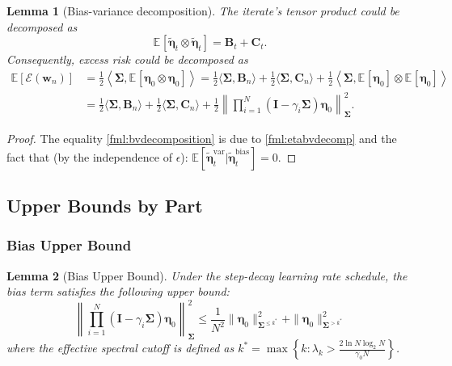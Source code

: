 \documentclass{article}
\theoremstyle{definition}
\theoremstyle{definition}
\theoremstyle{plain}
\theoremstyle{plain}
\theoremstyle{plain}
\newtheorem{lemma}{Lemma}
\theoremstyle{plain}
\theoremstyle{plain}
\newcommand{\bs}[1]{\boldsymbol{\mathbf{#1}}}
\newcommand{\Ex}{\mathbb{E}}
\newcommand{\Sig}{\mathbf{\Sigma}}
\newcommand{\w}{\mathbf{w}}
\newcommand{\id}{\mathbf{I}}
\newcommand{\bias}{\mathrm{bias}}
\newcommand{\var}{\mathrm{var}}
\newcommand{\ex}[2][]{\mathbb{E}_{#1}\left[ #2 \right]}
\newcommand{\nm}[2][]{\left\| #2 \right\|^2_{#1}}
\newcommand{\inner}[1]{\left\langle#1\right\rangle}
\begin{document}
\begin{lemma}[Bias-variance decomposition]
\label{lem:bvdecomp}
The iterate's tensor product could be decomposed as 
\begin{equation}\label{fml:bvdecomposition}
    \ex{\tilde{\bs\eta}_t\otimes\tilde{\bs\eta}_t}= \bs B_t + \bs C_t.
\end{equation}
Consequently, excess risk could be decomposed as
\begin{equation}
\begin{aligned}
    \Ex\left[\mathcal{E}(\w_{n})\right] &=\frac{1}{2}\inner{\Sig,\ex{\bs\eta_0\otimes\bs\eta_0}}=\frac{1}{2} \langle\bs\Sigma,\bs B_n\rangle+\frac{1}{2}\langle\bs\Sigma,\bs C_n\rangle + \frac{1}{2}\inner{\Sig,\ex{\bs\eta_0}\otimes \ex{\bs\eta_0}}\\
    & = \frac{1}{2} \langle\bs\Sigma,\bs B_n\rangle+\frac{1}{2}\langle\bs\Sigma,\bs C_n\rangle + \frac{1}{2} \nm[\Sig]{\prod_{i=1}^N(\id-\gamma_i\bs\Sigma)\bs\eta_0}.
\end{aligned}
\end{equation}
\end{lemma}
\begin{proof}
    The equality \ref{fml:bvdecomposition} is due to \ref{fml:etabvdecomp} and the fact that (by the independence of $\epsilon$): $\Ex[{\tilde{\bs\eta}_t^{\var}|\tilde{\bs\eta}_t^{\bias}}]=0$. 
\end{proof}


\subsection{Upper Bounds by Part}
\subsubsection{Bias Upper Bound}
\begin{lemma}[Bias Upper Bound]
    \label{lemma:bias_upper_bound}
    Under the step-decay learning rate schedule, the bias term satisfies the following upper bound:
    \begin{equation}
        \nm[\Sig]{\prod_{i=1}^N(\id-\gamma_i\bs\Sigma)\bs\eta_0}\leq \frac{1}{N^2}\|\bs\eta_0\|^2_{\Sig^{\leq k^*}} + \|\bs\eta_0\|^2_{\Sig^{>k^*}} 
    \end{equation}
    where the effective spectral cutoff is defined as $k^* = \max\left\{k:\lambda_{k}> \frac{2\ln N\log_2 N}{\gamma_0 N} \right\}$.
\end{lemma}
\end{document}
